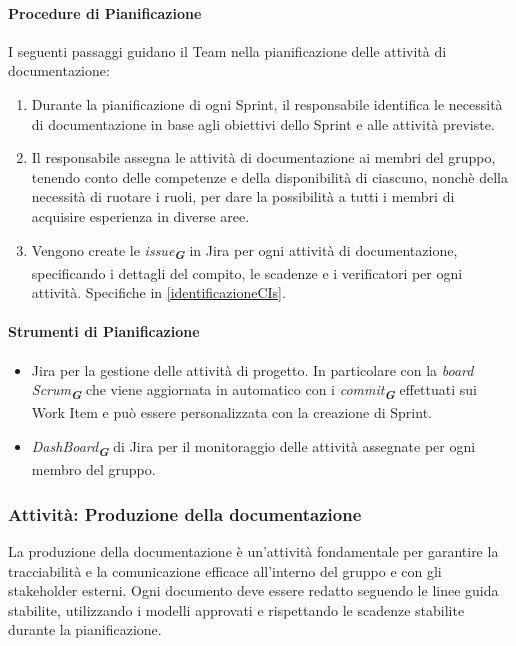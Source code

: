 \documentclass[a4paper,12pt]{article}
\newcommand{\glossario}[1]{\textit{#1}\textsubscript{\textbf{\textit{\textcolor{lightblack}{G}}}}}
\begin{document}
\paragraph{Procedure di Pianificazione}\label{procedurePianificaDocs}
I seguenti passaggi guidano il Team nella pianificazione delle attività di
documentazione:
\begin{enumerate}
    \item Durante la pianificazione di ogni Sprint, il
          responsabile identifica le necessità di documentazione in base agli
          obiettivi dello Sprint e alle attività previste.
    \item Il responsabile assegna le attività di documentazione ai membri del gruppo,
          tenendo conto delle competenze e della disponibilità di ciascuno, nonchè della
          necessità di ruotare i ruoli, per dare la possibilità a tutti i membri di
          acquisire esperienza in diverse aree.
    \item Vengono create le \glossario{issue} in Jira per ogni attività di
          documentazione, specificando i dettagli del compito, le scadenze e i
          verificatori per ogni attività. Specifiche in \ref{identificazioneCIs}.
\end{enumerate}
\paragraph{Strumenti di Pianificazione}
\begin{itemize}
    \item Jira per la gestione delle attività di progetto. In particolare con la \glossario{board Scrum} che viene aggiornata in automatico con i \glossario{commit} effettuati sui Work Item e può essere personalizzata con la creazione di Sprint.
    \item \glossario{DashBoard} di Jira per il monitoraggio delle attività assegnate per ogni membro del gruppo.
\end{itemize}


\subsubsection{Attività: Produzione della documentazione}\label{produzioneDocs}
La produzione della documentazione è un'attività fondamentale per garantire la tracciabilità e la comunicazione efficace all'interno del gruppo e con gli stakeholder esterni. Ogni documento deve essere redatto seguendo le linee guida stabilite, utilizzando i modelli approvati e rispettando le scadenze stabilite durante la pianificazione.
\end{document}
